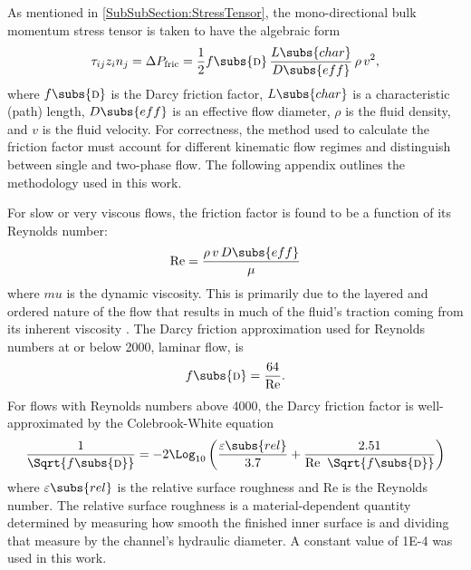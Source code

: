 \label{Appendix:FrictionFactors}

As mentioned in \cref{SubSubSection:StressTensor}, the mono-directional bulk momentum stress tensor is taken to have the algebraic form
\begin{equation}
    \tau_{ij} z_i n_j = \Delta{P}_{\text{fric}} = \frac{1}{2}
        f\subs{\textsc{d}}\,\frac{L\subs{char}}{D\subs{eff}}\,\rho\,v^2,
\end{equation}
where $f\subs{\textsc{d}}$ is the Darcy friction factor, $L\subs{char}$ is a characteristic (path) length, $D\subs{eff}$ is an effective flow diameter, $\rho$ is the fluid density, and $v$ is the fluid velocity.
For correctness, the method used to calculate the friction factor must account for different kinematic flow regimes and distinguish between single and two-phase flow.
The following appendix outlines the methodology used in this work.

For slow or very viscous flows, the friction factor is found to be a function of its Reynolds number:
\begin{equation}
    \text{Re} = \frac{\rho\,v\,D\subs{eff}}{\mu}
\end{equation}
where $mu$ is the dynamic viscosity.
This is primarily due to the layered and ordered nature of the flow that results in much of the fluid's traction coming from its inherent viscosity \cite{nellis_heat_2009}.
The Darcy friction approximation used for Reynolds numbers at or below \num{2000}, laminar flow, is 
\begin{equation}
    f\subs{\textsc{d}} = \frac{64}{\text{Re}}.
\end{equation}
For flows with Reynolds numbers above \num{4000}, the Darcy friction factor is well-approximated by the Colebrook-White equation
\begin{equation}
    \frac{1}{\Sqrt{f\subs{\textsc{d}}}} = -2 \Log_{10}\left(\frac{\varepsilon\subs{rel}}{3.7} + \frac{2.51}{\text{Re}\;\;\Sqrt{f\subs{\textsc{d}}}}\right)
\end{equation}
where $\varepsilon\subs{rel}$ is the relative surface roughness and $\text{Re}$ is the Reynolds number.
The relative surface roughness is a material-dependent quantity determined by measuring how smooth the finished inner surface is and dividing that measure by the channel's hydraulic diameter.
A constant value of \num{1E-4} was used in this work.

